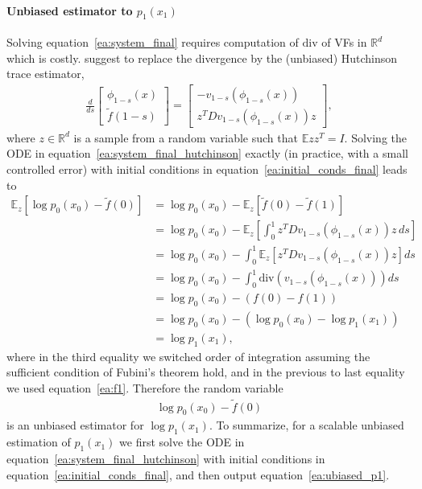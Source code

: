 \documentclass{article}
\newcommand{\parr}[1]{\left (#1\right )}
\newcommand{\brac}[1]{\left [#1\right ]}
\newcommand{\Real}{\mathbb R}
\newcommand{\divv}{\mathrm{div}} %
\def\eqref#1{equation~\ref{#1}}
\newcommand{\E}{\mathbb{E}}
\begin{document}
\paragraph{Unbiased estimator to $p_1(x_1)$}
Solving \eqref{ea:system_final} requires computation of $\divv$ of VFs in $\Real^d$ which is costly. \cite{ffjord2018} suggest to replace the divergence by the (unbiased) Hutchinson trace estimator, 
\begin{align}\label{ea:system_final_hutchinson}
    \frac{d}{ds}\begin{bmatrix}
    \phi_{1-s}(x) \\
    \tilde{f}(1-s)
    \end{bmatrix}=
    \begin{bmatrix}
    -v_{1-s}(\phi_{1-s}(x)) \\ 
    z^T Dv_{1-s}(\phi_{1-s}(x)) z
    \end{bmatrix},
\end{align}
where $z\in \Real^d$ is a sample from a random variable such that $\E zz^T=I$. Solving the ODE in \eqref{ea:system_final_hutchinson} exactly (in practice, with a  small controlled error) with initial conditions in \eqref{ea:initial_conds_final} leads to
\begin{align*}
    \E_z \brac{\log p_0(x_0) - \tilde{f}(0)} &= \log p_0(x_0) - \E_z \brac{\tilde{f}(0)-\tilde{f}(1)} \\
    &= \log p_0(x_0) - \E_z\brac{\int_0^1 z^T Dv_{1-s}(\phi_{1-s}(x)) z \, ds}  \\
    &= \log p_0(x_0) - \int_0^1 \E_z \brac{z^T Dv_{1-s}(\phi_{1-s}(x)) z } ds  \\
    &= \log p_0(x_0) - \int_0^1 \divv(v_{1-s}(\phi_{1-s}(x))) ds 
    \\
    &= \log p_0(x_0) - \parr{f(0)-f(1)} \\
    &= \log p_0(x_0) - \parr{\log p_0(x_0) - \log p_1(x_1)} \\
    &= \log p_1(x_1),
\end{align*} 
where in the third equality we switched order of integration assuming the sufficient condition of Fubini's theorem hold, and in the previous to last equality we used \eqref{ea:f1}. 
Therefore the random variable 
\begin{align}\label{ea:ubiased_p1}
    \log p_0(x_0) - \tilde{f}(0)
\end{align}
is an unbiased estimator for $\log p_1(x_1)$. To summarize, for a scalable unbiased estimation of $p_1(x_1)$ we first solve the ODE in \eqref{ea:system_final_hutchinson} with initial conditions in \eqref{ea:initial_conds_final}, and then output  \eqref{ea:ubiased_p1}. 
\end{document}
